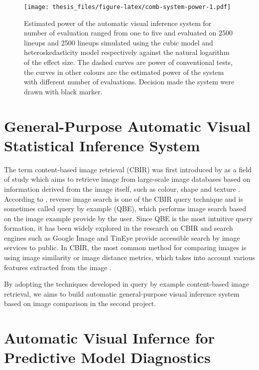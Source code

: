 \documentclass{monashthesis}
\theoremstyle{definition}
\theoremstyle{definition}
\theoremstyle{definition}
\theoremstyle{definition}
\theoremstyle{remark}
\begin{document}
\begin{figure}
\centering
\texttt{[image: thesis\_files/figure-latex/comb-system-power-1.pdf]}
\caption{\label{fig:comb-system-power}Estimated power of the automatic visual inference system for number of evaluation ranged from one to five and evaluated on 2500 lineups and 2500 lineups simulated using the cubic model and heteroskedasticity model respectively against the natural logarithm of the effect size. The dashed curves are power of conventional tests, the curves in other colours are the estimated power of the system with different number of evaluations. Decision made the system were drawn with black marker.}
\end{figure}

\hypertarget{se:project-2}{%
\chapter{General-Purpose Automatic Visual Statistical Inference System}\label{se:project-2}}

The term content-based image retrieval (CBIR) was first introduced by \textcite{kato_database_1992} as a field of study which aims to retrieve image from large-scale image databases based on information derived from the image itself, such as colour, shape and texture \autocite{rafiee_review_2010}. According to \textcite{zhou_recent_2017}, reverse image search is one of the CBIR query technique and is sometimes called query by example (QBE), which performs image search based on the image example provide by the user. Since QBE is the most intuitive query formation, it has been widely explored in the research on CBIR and search engines such as Google Image \autocite{google_google_2022} and TinEye \autocite{tineye_tineye_2022} provide accessible search by image services to public. In CBIR, the most common method for comparing images is using image similarity or image distance metrics, which takes into account various features extracted from the image \autocite{zhou_recent_2017}.

By adopting the techniques developed in query by example content-based image retrieval, we aims to build automatic general-purpose visual inference system based on image comparison in the second project.

\hypertarget{se:project-3}{%
\chapter{Automatic Visual Infernce for Predictive Model Diagnostics}\label{se:project-3}}
\end{document}
